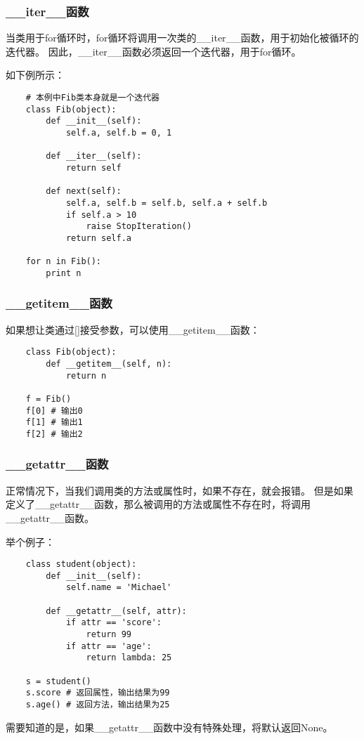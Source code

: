 \documentclass[a4paper,left=2.5cm,right=2.5cm,11pt]{article}
\begin{document}
\subsubsection{\_\_iter\_\_函数}
	当类用于for循环时，for循环将调用一次类的\_\_iter\_\_函数，用于初始化被循环的迭代器。
	因此，\_\_iter\_\_函数必须返回一个迭代器，用于for循环。\par

	如下例所示：
	\begin{lstlisting}
	# 本例中Fib类本身就是一个迭代器
	class Fib(object):
		def __init__(self):
			self.a, self.b = 0, 1

		def __iter__(self):
			return self 
			
		def next(self):
			self.a, self.b = self.b, self.a + self.b
			if self.a > 10
				raise StopIteration()
			return self.a

	for n in Fib():
		print n
	\end{lstlisting}

\subsubsection{\_\_getitem\_\_函数}
	如果想让类通过[]接受参数，可以使用\_\_getitem\_\_函数：
	\begin{lstlisting}
	class Fib(object):
		def __getitem__(self, n):
			return n

	f = Fib()
	f[0] # 输出0
	f[1] # 输出1
	f[2] # 输出2
	\end{lstlisting}

\subsubsection{\_\_getattr\_\_函数}
	正常情况下，当我们调用类的方法或属性时，如果不存在，就会报错。
	但是如果定义了\_\_getattr\_\_函数，那么被调用的方法或属性不存在时，将调用\_\_getattr\_\_函数。\par

	举个例子：
	\begin{lstlisting}
	class student(object):
		def __init__(self):
			self.name = 'Michael'

		def __getattr__(self, attr):
			if attr == 'score':
				return 99
			if attr == 'age':
				return lambda: 25
	
	s = student()
	s.score # 返回属性，输出结果为99
	s.age() # 返回方法，输出结果为25
	\end{lstlisting}

	需要知道的是，如果\_\_getattr\_\_函数中没有特殊处理，将默认返回None。
\end{document}
